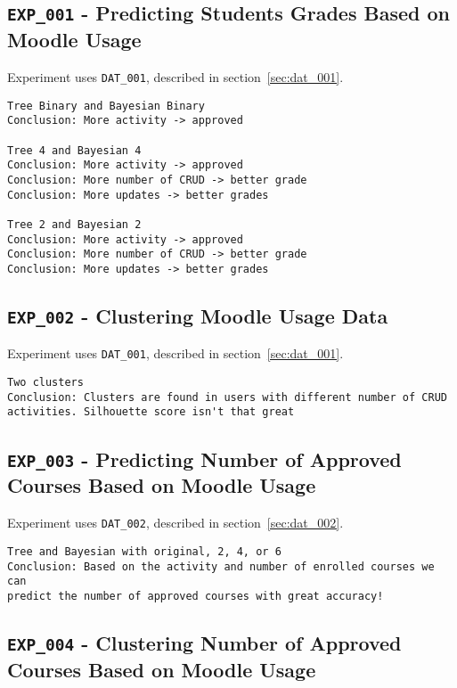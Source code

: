 \subsection{\texttt{EXP\_001} - Predicting Students Grades Based on Moodle
Usage}

Experiment uses \texttt{DAT\_001}, described in section~\ref{sec:dat_001}.

\begin{verbatim}
Tree Binary and Bayesian Binary
Conclusion: More activity -> approved

Tree 4 and Bayesian 4
Conclusion: More activity -> approved
Conclusion: More number of CRUD -> better grade
Conclusion: More updates -> better grades

Tree 2 and Bayesian 2
Conclusion: More activity -> approved
Conclusion: More number of CRUD -> better grade
Conclusion: More updates -> better grades
\end{verbatim}

\subsection{\texttt{EXP\_002} - Clustering Moodle Usage Data}

Experiment uses \texttt{DAT\_001}, described in section~\ref{sec:dat_001}.

\begin{verbatim}
Two clusters
Conclusion: Clusters are found in users with different number of CRUD
activities. Silhouette score isn't that great
\end{verbatim}

\subsection{\texttt{EXP\_003} - Predicting Number of Approved Courses Based on
Moodle Usage}

Experiment uses \texttt{DAT\_002}, described in section~\ref{sec:dat_002}.

\begin{verbatim}
Tree and Bayesian with original, 2, 4, or 6
Conclusion: Based on the activity and number of enrolled courses we can
predict the number of approved courses with great accuracy!
\end{verbatim}

\subsection{\texttt{EXP\_004} - Clustering Number of Approved Courses Based on
Moodle Usage}

